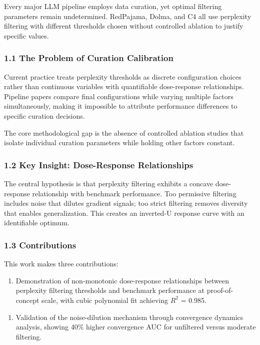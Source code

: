 
Every major LLM pipeline employs data curation, yet optimal filtering parameters remain undetermined. RedPajama, Dolma, and C4 all use perplexity filtering with different thresholds chosen without controlled ablation to justify specific values.

\subsubsection{1.1 The Problem of Curation Calibration}

Current practice treats perplexity thresholds as discrete configuration choices rather than continuous variables with quantifiable dose-response relationships. Pipeline papers compare final configurations while varying multiple factors simultaneously, making it impossible to attribute performance differences to specific curation decisions.

The core methodological gap is the absence of controlled ablation studies that isolate individual curation parameters while holding other factors constant.

\subsubsection{1.2 Key Insight: Dose-Response Relationships}

The central hypothesis is that perplexity filtering exhibits a concave dose-response relationship with benchmark performance. Too permissive filtering includes noise that dilutes gradient signals; too strict filtering removes diversity that enables generalization. This creates an inverted-U response curve with an identifiable optimum.

\subsubsection{1.3 Contributions}

This work makes three contributions:

\begin{enumerate}
\item Demonstration of non-monotonic dose-response relationships between perplexity filtering thresholds and benchmark performance at proof-of-concept scale, with cubic polynomial fit achieving $R^2$ = 0.985.
\end{enumerate}

\begin{enumerate}
\item Validation of the noise-dilution mechanism through convergence dynamics analysis, showing 40\% higher convergence AUC for unfiltered versus moderate filtering.
\end{enumerate}

